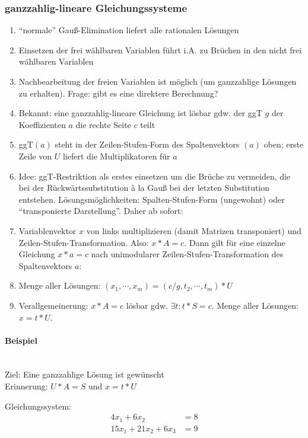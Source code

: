 \subsubsection{ganzzahlig-lineare Gleichungssysteme}
\begin{enumerate}
	\item ``normale'' Gauß-Elimination liefert alle rationalen Lösungen
	\item Einsetzen der frei wählbaren Variablen führt i.A. zu Brüchen in den nicht frei wählbaren Variablen
	\item Nachbearbeitung der freien Variablen ist möglich (um ganzzahlige Lösungen zu erhalten).
		Frage: gibt es eine direktere Berechnung?
	\item Bekannt: eine ganzzahlig-lineare Gleichung ist lösbar gdw. der ggT $g$ der Koeffizienten $a$ die rechte Seite $c$ teilt
	\item ggT$(a)$ steht in der Zeilen-Stufen-Form des Spaltenvektors $(a)$ oben; erste Zeile von $U$ liefert die Multiplikatoren für $a$
	\item Idee: ggT-Restriktion als erstes einsetzen um die Brüche zu vermeiden,
		die bei der Rückwärtssubstitution \`a la Gauß bei der letzten Substitution entstehen.
		Lösungsmöglichkeiten: Spalten-Stufen-Form (ungewohnt) oder ``transponierte Darstellung''.
		Daher ab sofort:
	\item Variablenvektor $x$ von links multiplizieren (damit Matrizen transponiert) und Zeilen-Stufen-Transformation.
		Also: $x*A = c$. Dann gilt für eine einzelne Gleichung $x*a=c$ nach unimodularer Zeilen-Stufen-Transformation des Spaltenvektors $a$:
	\item Menge aller Lösungen: $(x_1,\cdots,x_m) = (c/g,t_2,\cdots,t_m)* U$
	\item Verallgemeinerung: $x*A = c$ lösbar gdw. $\exists t: t*S = c$. Menge aller Lösungen: $x = t*U$.
\end{enumerate}


\paragraph{Beispiel}~\\
Ziel: Eine ganzzahlige Lösung ist gewünscht~\\
Erinnerung: $U*A = S$ und $x = t*U$

Gleichungssystem:
\begin{align*}
  4x_1 +  6x_2         & = 8 \\
  15x_1 + 21x_2 + 6x_3 & = 9
\end{align*}

